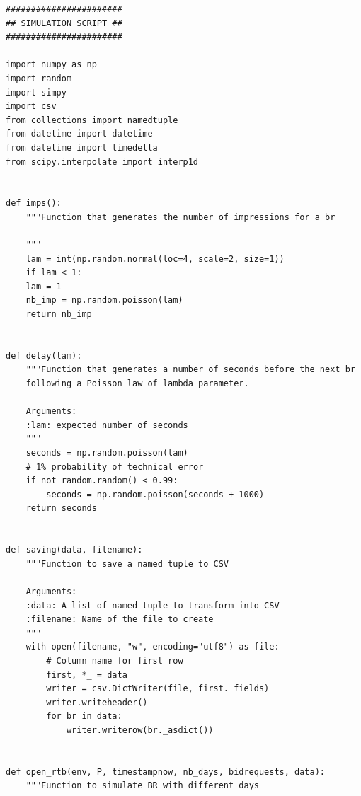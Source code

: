 \documentclass[12pt]{article}
\begin{document}
\begin{lstlisting}[style=Python]
#######################
## SIMULATION SCRIPT ##
#######################

import numpy as np
import random
import simpy
import csv
from collections import namedtuple
from datetime import datetime
from datetime import timedelta
from scipy.interpolate import interp1d


def imps():
	"""Function that generates the number of impressions for a br
	
	"""
	lam = int(np.random.normal(loc=4, scale=2, size=1))
	if lam < 1:
	lam = 1
	nb_imp = np.random.poisson(lam)
	return nb_imp


def delay(lam):
	"""Function that generates a number of seconds before the next br 
	following a Poisson law of lambda parameter.
	
	Arguments:
	:lam: expected number of seconds
	"""
	seconds = np.random.poisson(lam)
	# 1% probability of technical error
	if not random.random() < 0.99:
		seconds = np.random.poisson(seconds + 1000)
	return seconds


def saving(data, filename):
	"""Function to save a named tuple to CSV
	
	Arguments:
	:data: A list of named tuple to transform into CSV
	:filename: Name of the file to create
	"""
	with open(filename, "w", encoding="utf8") as file:
		# Column name for first row
		first, *_ = data
		writer = csv.DictWriter(file, first._fields)
		writer.writeheader()
		for br in data:
			writer.writerow(br._asdict())


def open_rtb(env, P, timestampnow, nb_days, bidrequests, data):
	"""Function to simulate BR with different days
	

\end{lstlisting}
\end{document}
